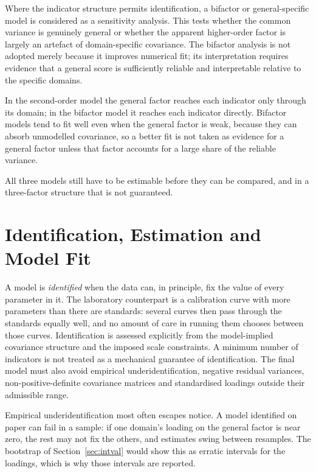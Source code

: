 Where the indicator structure permits identification, a bifactor or general-specific model is considered as a sensitivity analysis. This tests whether the common variance is genuinely general or whether the apparent higher-order factor is largely an artefact of domain-specific covariance. The bifactor analysis is not adopted merely because it improves numerical fit; its interpretation requires evidence that a general score is sufficiently reliable and interpretable relative to the specific domains.

In the second-order model the general factor reaches each indicator only through its domain; in the bifactor model it reaches each indicator directly. Bifactor models tend to fit well even when the general factor is weak, because they can absorb unmodelled covariance, so a better fit is not taken as evidence for a general factor unless that factor accounts for a large share of the reliable variance.

All three models still have to be estimable before they can be compared, and in a three-factor structure that is not guaranteed.

\section{Identification, Estimation and Model Fit}
\label{sec:identification}

A model is \emph{identified} when the data can, in principle, fix the value of every parameter in it. The laboratory counterpart is a calibration curve with more parameters than there are standards: several curves then pass through the standards equally well, and no amount of care in running them chooses between those curves. Identification is assessed explicitly from the model-implied covariance structure and the imposed scale constraints. A minimum number of indicators is not treated as a mechanical guarantee of identification. The final model must also avoid empirical underidentification, negative residual variances, non-positive-definite covariance matrices and standardised loadings outside their admissible range.

Empirical underidentification most often escapes notice. A model identified on paper can fail in a sample: if one domain's loading on the general factor is near zero, the rest may not fix the others, and estimates swing between resamples. The bootstrap of Section~\ref{sec:intval} would show this as erratic intervals for the loadings, which is why those intervals are reported.

